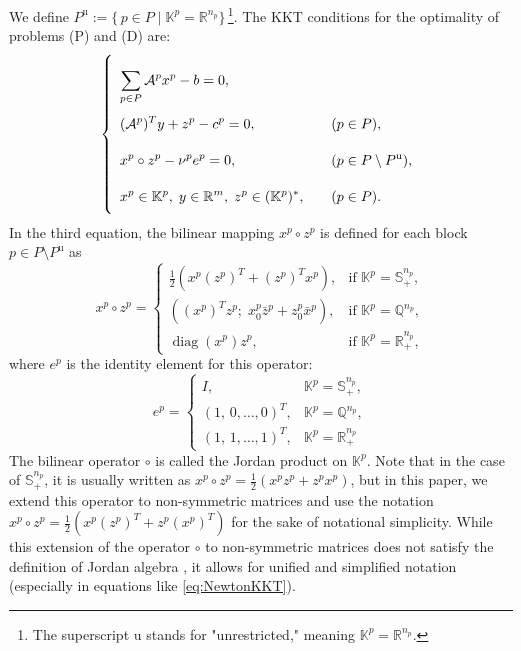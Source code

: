 We define $P^{\text{u}} := \{\, p \in P \mid \mathbb{K}^p = \mathbb{R}^{n_p} \}\,$\footnote{%
  The superscript $\text{u}$ stands for "unrestricted," meaning $\mathbb{K}^p = \mathbb{R}^{n_p}$.
}.
The KKT conditions for the optimality of problems (P) and (D) are:
\begin{equation}
    \everymath{\displaystyle}
    \renewcommand{\arraystretch}{2.5}
    \left\{
    \begin{array}{ll}
        \sum_{p \in P} \mathcal{A}^p x^p - b = 0, & \\[-4pt]
        (\mathcal{A}^p)^T y + z^p - c^p = 0, & \quad (p \in P),\\[-4pt]
        x^p \circ z^p - \nu^p e^p = 0, & \quad (p \in P \setminus P^{\text{u}}),\\[-4pt]
        x^p \in \mathbb{K}^p,\; y \in \mathbb{R}^m,\; z^p \in (\mathbb{K}^p)^*, & \quad (p \in P).
    \end{array}
    \right.
    \label{eq:KKTcond}
\end{equation}
In the third equation, the bilinear mapping $x^p \circ z^p$ is defined for each block $p \in P \setminus P^{\text{u}}$ as
\[
  x^p \circ z^p = 
  \begin{cases}
    \frac{1}{2} \left( x^p (z^p)^T + (z^p)^T x^p \right), 
      & \text{if } \mathbb{K}^p = \mathbb{S}^{n_p}_+,\\[4pt]
    \left( (x^p)^T z^p;\; x^p_0 \bar{z}^p + z^p_0 \bar{x}^p \right),
      & \text{if } \mathbb{K}^p = \mathbb{Q}^{n_p},\\[4pt]
    \operatorname{diag}(x^p) z^p,
      & \text{if } \mathbb{K}^p = \mathbb{R}^{n_p}_+,
  \end{cases}
\]
where $e^p$ is the identity element for this operator:
\[
  e^p = 
  \begin{cases}
    I, & \mathbb{K}^p = \mathbb{S}^{n_p}_+,\\[3pt]
    (1,\,0,\ldots,0)^T, & \mathbb{K}^p = \mathbb{Q}^{n_p},\\[3pt]
    (1,\,1,\ldots,1)^T, & \mathbb{K}^p = \mathbb{R}^{n_p}_+ %
  \end{cases}
\]
The bilinear operator $\circ$ is called the Jordan product on $\mathbb{K}^p$.
Note that in the case of $\mathbb{S}^{n_p}_+$, it is usually written as $x^p \circ z^p = \frac{1}{2}(x^p z^p + z^p x^p)$, but in this paper, we extend this operator to non-symmetric matrices and use the notation $x^p \circ z^p = \frac{1}{2} \left( x^p (z^p)^T + z^p (x^p)^T \right)$ for the sake of notational simplicity.
While this extension of the operator $\circ$ to non-symmetric matrices does not satisfy the definition of Jordan algebra \cite{Faraut1994}, it allows for unified and simplified notation (especially in equations like \eqref{eq:NewtonKKT}).


